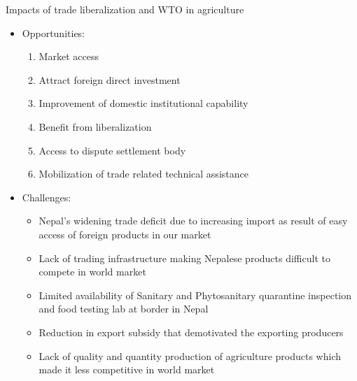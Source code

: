 \documentclass[12pt,ignorenonframetext,aspectratio=169]{beamer}
\providecommand{\tightlist}{%
  \setlength{\itemsep}{0pt}\setlength{\parskip}{0pt}}
\begin{document}
\begin{frame}{Impacts of trade liberalization and WTO in agriculture}
\protect\hypertarget{impacts-of-trade-liberalization-and-wto-in-agriculture}{}
\begin{itemize}
\tightlist
\item
  Opportunities:

  \begin{enumerate}
  \tightlist
  \item
    Market access
  \item
    Attract foreign direct investment
  \item
    Improvement of domestic institutional capability
  \item
    Benefit from liberalization
  \item
    Access to dispute settlement body
  \item
    Mobilization of trade related technical assistance
  \end{enumerate}
\end{itemize}
\end{frame}

\begin{frame}{}
\protect\hypertarget{section-3}{}
\begin{itemize}
\tightlist
\item
  Challenges:

  \begin{itemize}
  \tightlist
  \item
    Nepal's widening trade deficit due to increasing import as result of
    easy access of foreign products in our market
  \item
    Lack of trading infrastructure making Nepalese products difficult to
    compete in world market
  \item
    Limited availability of Sanitary and Phytosanitary quarantine
    inspection and food testing lab at border in Nepal
  \item
    Reduction in export subsidy that demotivated the exporting producers
  \item
    Lack of quality and quantity production of agriculture products
    which made it less competitive in world market
  \end{itemize}
\end{itemize}
\end{frame}
\end{document}
